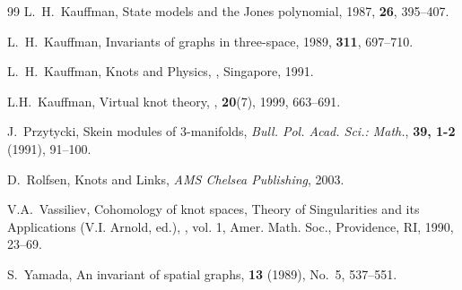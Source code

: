 \documentclass[11pt,a4paper]{article}
\theoremstyle{plain}
\theoremstyle{definition}
\begin{document}
\begin{thebibliography}{99}
L.~H.~Kauffman,
\newblock State models and the Jones polynomial,
 1987, \textbf{26}, 395--407.

L.~H.~Kauffman,
\newblock Invariants of graphs in three-space,
 1989, \textbf{311}, 697--710.

L.~H.~Kauffman,
\newblock Knots and Physics,
, Singapore, 1991.

L.H.~Kauffman,
\newblock Virtual knot theory,
, {\bf 20}(7), 1999, 663--691.

J.~Przytycki,
\newblock Skein modules of 3-manifolds,
\newblock \emph{Bull. Pol. Acad. Sci.: Math.}, {\bf 39, 1-2} (1991), 91--100.

D.~Rolfsen,
\newblock Knots and Links,
\newblock \emph{AMS Chelsea Publishing}, 2003.

V.A.~Vassiliev,
\newblock Cohomology of knot spaces,
\newblock Theory of Singularities and its Applications (V.I. Arnold, ed.),
, vol. 1, Amer. Math. Soc., Providence, RI, 1990, 23--69.

S.~Yamada,
\newblock An invariant of spatial graphs,
 \textbf{13} (1989), No.~5, 537--551.



\end{thebibliography}
\end{document}
